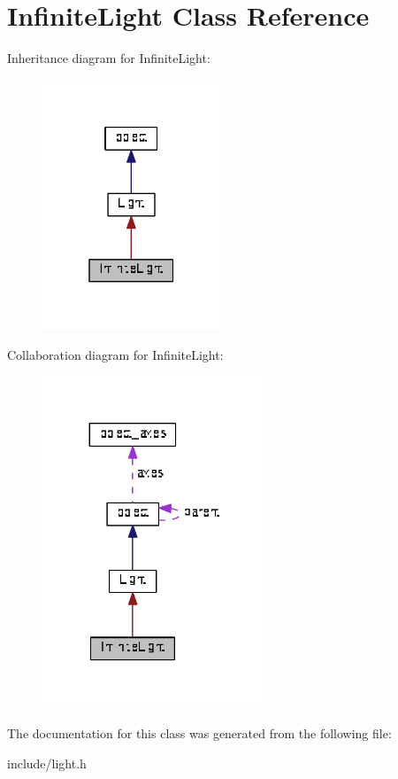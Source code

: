 \hypertarget{classInfiniteLight}{}\section{Infinite\+Light Class Reference}
\label{classInfiniteLight}


Inheritance diagram for Infinite\+Light\+:\nopagebreak
\begin{figure}[H]
\begin{center}
\leavevmode
\includegraphics[width=151pt]{classInfiniteLight__inherit__graph}
\end{center}
\end{figure}


Collaboration diagram for Infinite\+Light\+:\nopagebreak
\begin{figure}[H]
\begin{center}
\leavevmode
\includegraphics[width=191pt]{classInfiniteLight__coll__graph}
\end{center}
\end{figure}


The documentation for this class was generated from the following file\+:\begin{DoxyCompactItemize}
\item 
include/light.\+h\end{DoxyCompactItemize}
